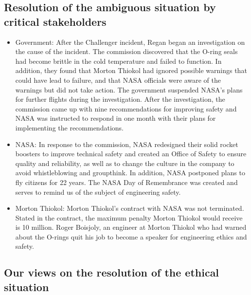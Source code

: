 \documentclass{article}
\begin{document}
\vspace{10pt}
\subsection{Resolution of the ambiguous situation by critical stakeholders}

\begin{itemize}

\item
Government:
After the Challenger incident, Regan began an investigation on the cause of the incident. The commission discovered that the O-ring seals had become brittle in the cold temperature and failed to function. In addition, they found that Morton Thiokol had ignored possible warnings that could have lead to failure, and that NASA officials were aware of the warnings but did not take action. The government suspended NASA’s plans for further flights during the investigation. After the investigation, the commission came up with nine recommendations for improving safety and NASA was instructed to respond in one month with their plans for implementing the recommendations.

\item
NASA:
In response to the commission, NASA redesigned their solid rocket boosters to improve technical safety and created an Office of Safety to ensure quality and reliability, as well as to change the culture in the company to avoid whistleblowing and groupthink. In addition, NASA postponed plans to fly citizens for 22 years. The NASA Day of Remembrance was created and serves to remind us of the subject of engineering safety.

\item
Morton Thiokol:
Morton Thiokol's contract with NASA was not terminated. Stated in the contract, the maximum penalty Morton Thiokol would receive is 10 million.
Roger Boisjoly, an engineer at Morton Thiokol who had warned about the O-rings quit his job to become a speaker for engineering ethics and safety.
\end{itemize}

\vspace{10pt}
\subsection{Our views on the resolution of the ethical situation}
\end{document}
